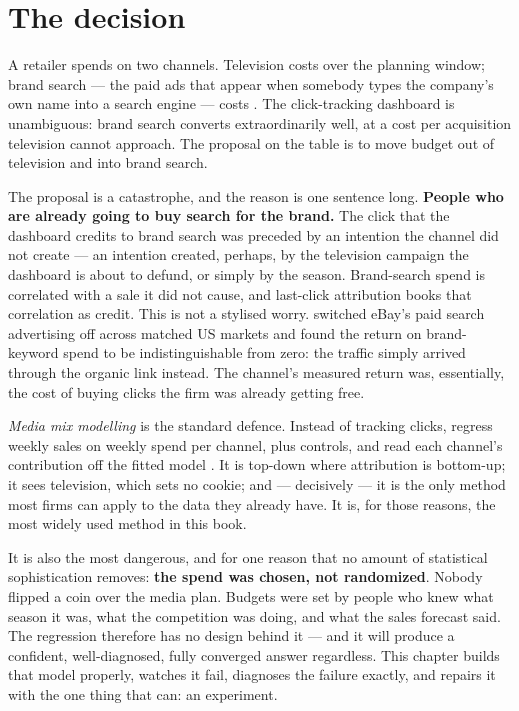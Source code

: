 \section{The decision}
\label{sec:mmm:decision}

A retailer spends on two channels. Television costs \eur{\nbSixSpendTv} over the planning window;
brand search --- the paid ads that appear when somebody types the company's own name into a search
engine --- costs \eur{\nbSixSpendBs}. The click-tracking dashboard is unambiguous: brand search
converts extraordinarily well, at a cost per acquisition television cannot approach. The proposal
on the table is to move budget out of television and into brand search.

The proposal is a catastrophe, and the reason is one sentence long. \textbf{People who are already
going to buy search for the brand.} The click that the dashboard credits to brand search was
preceded by an intention the channel did not create --- an intention created, perhaps, by the
television campaign the dashboard is about to defund, or simply by the season. Brand-search spend
is correlated with a sale it did not cause, and last-click attribution books that correlation as
credit. This is not a stylised worry. \citet{blake2015} switched eBay's paid search advertising
off across matched US markets and found the return on brand-keyword spend to be indistinguishable
from zero: the traffic simply arrived through the organic link instead. The channel's measured
return was, essentially, the cost of buying clicks the firm was already getting free.

\emph{Media mix modelling} is the standard defence. Instead of tracking clicks, regress weekly
sales on weekly spend per channel, plus controls, and read each channel's contribution off the
fitted model \citep{little1979, chan2017}. It is top-down where attribution is bottom-up; it sees
television, which sets no cookie; and --- decisively --- it is the only method most firms can
apply to the data they already have. It is, for those reasons, the most widely used method in this
book.

It is also the most dangerous, and for one reason that no amount of statistical sophistication
removes: \textbf{the spend was chosen, not randomized}. Nobody flipped a coin over the media plan.
Budgets were set by people who knew what season it was, what the competition was doing, and what
the sales forecast said. The regression therefore has no design behind it --- and it will produce
a confident, well-diagnosed, fully converged answer regardless. This chapter builds that model
properly, watches it fail, diagnoses the failure exactly, and repairs it with the one thing that
can: an experiment.

